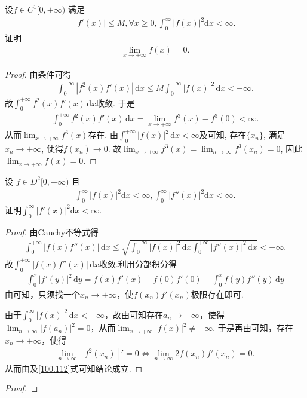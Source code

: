\documentclass[../../main.tex]{subfiles}
\begin{document}
\begin{example}
设$f \in C^1[0, +\infty)$ 满足
\begin{align*}
|f'(x)| \leqslant M, \forall x \geqslant 0, \int_0^{\infty} |f(x)|^2 \mathrm{d}x < \infty.
\end{align*}
证明
\begin{align*}
\lim_{x \to +\infty} f(x) = 0.
\end{align*}
\end{example}
\begin{proof}
由条件可得
\begin{align*}
\int_0^{+\infty} \left| f^2(x) f'(x) \right| \, \mathrm{d}x \leqslant M \int_0^{+\infty} \left| f(x) \right|^2 \, \mathrm{d}x < +\infty.
\end{align*}
故$\int_0^{+\infty} f^2(x) f'(x) \, \mathrm{d}x$收敛. 于是
\begin{align*}
\int_0^{+\infty} f^2(x) f'(x) \, \mathrm{d}x = \lim_{x \to +\infty} f^3(x) - f^3(0) < \infty.
\end{align*}
从而$\lim_{x \to +\infty} f^3(x)$存在. 由$\int_0^{+\infty} \left| f(x) \right|^2 \, \mathrm{d}x < \infty$及可知, 存在$\{x_n\}$, 满足$x_n \to +\infty$, 使得$f(x_n) \to 0$.
故$\lim_{x \to +\infty} f^3(x) = \lim_{n \to \infty} f^3(x_n) = 0$, 因此$\lim_{x \to +\infty} f(x) = 0$.
\end{proof}

\begin{example}
设 $f \in D^2[0, +\infty)$ 且
\begin{align*}
\int_0^{\infty} |f(x)|^2 \mathrm{d}x < \infty, \int_0^{\infty} |f''(x)|^2 \mathrm{d}x < \infty.
\end{align*}
证明$\int_0^{\infty} |f'(x)|^2 \mathrm{d}x < \infty$.
\end{example}
\begin{proof}
由Cauchy不等式得
\begin{align*}
\int_0^{+\infty}|f(x)f''(x)|\,\mathrm{d}x\leqslant\sqrt{\int_0^{+\infty}|f(x)|^2\,\mathrm{d}x\int_0^{+\infty}|f''(x)|^2\,\mathrm{d}x}<+\infty.
\end{align*}
故$\int_0^{+\infty}|f(x)f''(x)|\,\mathrm{d}x$收敛.利用分部积分得
\begin{align}\label{100.112}
\int_0^x|f'(y)|^2\,\mathrm{d}y=f(x)f'(x)-f(0)f'(0)-\int_0^x f(y)f''(y)\,\mathrm{d}y
\end{align}
由可知，只须找一个$x_n\rightarrow+\infty$，使$f(x_n)f'(x_n)$极限存在即可.

由于$\int_0^{\infty}|f(x)|^2\,\mathrm{d}x<+\infty$，故由可知存在$a_n\rightarrow+\infty$，使得$\lim_{n\rightarrow\infty}|f(a_n)|^2=0$，从而$\lim_{x\rightarrow+\infty}|f(x)|^2\ne+\infty$.
于是再由可知，存在$x_n\rightarrow+\infty$，使得
\begin{align*}
\lim_{n\rightarrow\infty}[f^2(x_n)]'=0\Longleftrightarrow\lim_{n\rightarrow\infty}2f(x_n)f'(x_n)=0.
\end{align*}
从而由及\eqref{100.112}式可知结论成立.
\end{proof}

\begin{example}

\end{example}
\begin{proof}

\end{proof}
\end{document}
